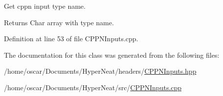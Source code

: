 Get cppn input type name. 

\begin{DoxyReturn}{Returns}
Char array with type name. 
\end{DoxyReturn}


Definition at line 53 of file C\-P\-P\-N\-Inputs.\-cpp.



The documentation for this class was generated from the following files\-:\begin{DoxyCompactItemize}
\item 
/home/oscar/\-Documents/\-Hyper\-Neat/headers/\hyperlink{_c_p_p_n_inputs_8hpp}{C\-P\-P\-N\-Inputs.\-hpp}\item 
/home/oscar/\-Documents/\-Hyper\-Neat/src/\hyperlink{_c_p_p_n_inputs_8cpp}{C\-P\-P\-N\-Inputs.\-cpp}\end{DoxyCompactItemize}

